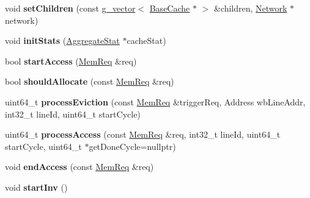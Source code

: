 \begin{DoxyCompactItemize}
\item 
\hypertarget{classMESITerminalCC_a2bbbc4214ffadd1115a67dbd49ee50ab}{void {\bfseries set\-Children} (const \hyperlink{classg__vector}{g\-\_\-vector}$<$ \hyperlink{classBaseCache}{Base\-Cache} $\ast$ $>$ \&children, \hyperlink{classNetwork}{Network} $\ast$network)}\label{classMESITerminalCC_a2bbbc4214ffadd1115a67dbd49ee50ab}

\item 
\hypertarget{classMESITerminalCC_a1ee7f811161cb4951b6c1b35e79e9402}{void {\bfseries init\-Stats} (\hyperlink{classAggregateStat}{Aggregate\-Stat} $\ast$cache\-Stat)}\label{classMESITerminalCC_a1ee7f811161cb4951b6c1b35e79e9402}

\item 
\hypertarget{classMESITerminalCC_a5b9506a6b60ad1f23ff23bd3ed1343c7}{bool {\bfseries start\-Access} (\hyperlink{structMemReq}{Mem\-Req} \&req)}\label{classMESITerminalCC_a5b9506a6b60ad1f23ff23bd3ed1343c7}

\item 
\hypertarget{classMESITerminalCC_a42f3aa120a60de090a2483938561d07c}{bool {\bfseries should\-Allocate} (const \hyperlink{structMemReq}{Mem\-Req} \&req)}\label{classMESITerminalCC_a42f3aa120a60de090a2483938561d07c}

\item 
\hypertarget{classMESITerminalCC_ae5589835876a10a06e49e1f9c2d54381}{uint64\-\_\-t {\bfseries process\-Eviction} (const \hyperlink{structMemReq}{Mem\-Req} \&trigger\-Req, Address wb\-Line\-Addr, int32\-\_\-t line\-Id, uint64\-\_\-t start\-Cycle)}\label{classMESITerminalCC_ae5589835876a10a06e49e1f9c2d54381}

\item 
\hypertarget{classMESITerminalCC_a3c47894ac0d31aed1fef4a66f4a2ac04}{uint64\-\_\-t {\bfseries process\-Access} (const \hyperlink{structMemReq}{Mem\-Req} \&req, int32\-\_\-t line\-Id, uint64\-\_\-t start\-Cycle, uint64\-\_\-t $\ast$get\-Done\-Cycle=nullptr)}\label{classMESITerminalCC_a3c47894ac0d31aed1fef4a66f4a2ac04}

\item 
\hypertarget{classMESITerminalCC_a648c7b00a16e95ac97f7efae7d97c431}{void {\bfseries end\-Access} (const \hyperlink{structMemReq}{Mem\-Req} \&req)}\label{classMESITerminalCC_a648c7b00a16e95ac97f7efae7d97c431}

\item 
\hypertarget{classMESITerminalCC_a2cc6d5b9501e12509bd9318932cf7ab8}{void {\bfseries start\-Inv} ()}\label{classMESITerminalCC_a2cc6d5b9501e12509bd9318932cf7ab8}


\end{DoxyCompactItemize}
